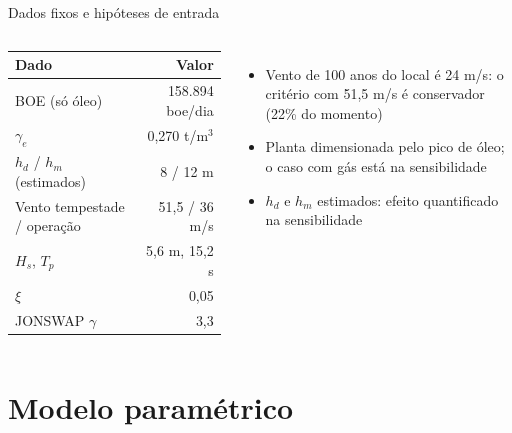 \documentclass[aspectratio=169,10pt]{beamer}
\begin{document}
\begin{frame}{Dados fixos e hipóteses de entrada}
\begin{columns}[T]
\small
\begin{tabular}{lr}
\toprule
Dado & Valor \\
\midrule
BOE (só óleo) & 158.894 boe/dia \\
$\gamma_e$ & 0,270 t/m$^3$ \\
$h_d$ / $h_m$ (estimados) & 8 / 12 m \\
Vento tempestade / operação & 51,5 / 36 m/s \\
$H_s$, $T_p$ & 5,6 m, 15,2 s \\
$\xi$ & 0,05 \\
JONSWAP $\gamma$ & 3,3 \\
\bottomrule
\end{tabular}
\small
\begin{itemize}
\item Vento de 100 anos do local é 24 m/s: o critério com 51,5 m/s é conservador (22\% do momento)
\item Planta dimensionada pelo pico de óleo; o caso com gás está na sensibilidade
\item $h_d$ e $h_m$ estimados: efeito quantificado na sensibilidade
\end{itemize}
\end{columns}
\end{frame}

\section{Modelo paramétrico}
\end{document}
